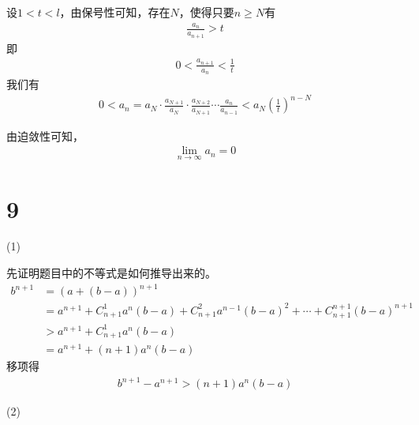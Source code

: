 \documentclass{article}
\begin{document}
\begin{itemize}
        设$1 < t < l$，由保号性可知，存在$N$，使得只要$n \geq N$有
        \begin{align*}
          \frac{a_n}{a_{n + 1}} > t
        \end{align*}
        即
        \begin{align*}
          0 < \frac{a_{n + 1}}{a_n} < \frac{1}{t}
        \end{align*}
        我们有
        \begin{align*}
          0 < a_n = a_N \cdot \frac{a_{N + 1}}{a_N} \cdot \frac{a_{N + 2}}{a_{N + 1}} \cdots \frac{a_n}{a_{n - 1}}
          < a_N (\frac{1}{t})^{n - N}
        \end{align*}

        由迫敛性可知，
        \begin{align*}
          \lim\limits_{n \to \infty} a_n = 0
        \end{align*}

\end{itemize}

\section*{9}

 (1)

先证明题目中的不等式是如何推导出来的。
\begin{align*}
  b^{n + 1} & = (a + (b - a))^{n + 1}                                                                                        \\
            & = a^{n + 1} + C_{n+1}^1 a^{n} (b - a) + C_{n+1}^2 a^{n - 1} (b - a)^2 + \cdots + C_{n+1}^{n + 1} (b-a)^{n + 1} \\
            & > a^{n + 1} + C_{n+1}^1 a^{n} (b - a)                                                                          \\
            & = a^{n + 1} + (n + 1) a^{n} (b - a)
\end{align*}
移项得
\begin{align*}
  b^{n + 1} - a^{n + 1} > (n + 1) a^{n} (b - a)
\end{align*}

(2)
\end{document}
